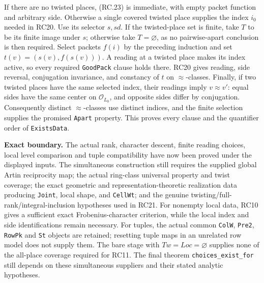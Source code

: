 If there are no twisted places, (RC.23) is immediate, with empty
packet function and arbitrary side. Otherwise a single covered
twisted place supplies the index $i_0$ needed in RC20.
Use its selector $s,sd$. If the twisted-place set is finite, take
$T$ to be its finite image under $s$; otherwise take $T=\varnothing$,
as no pairwise-apart conclusion is then required.
Select packets $f(i)$ by the preceding induction and set
$t(v)=(s(v),f(s(v)))$.
A reading at a twisted place makes its index active, so every
required \texttt{GoodPack} clause holds there.
RC20 gives reading, side reversal, conjugation invariance, and
constancy of $t$ on $\approx$-classes.
Finally, if two twisted places have the same selected index,
their readings imply $v\approx v'$: equal sides have the same
center on $\mathcal O_{L_0}$, and opposite sides differ by conjugation.
Consequently distinct $\approx$-classes use distinct indices, and
the finite selection supplies the promised \texttt{Apart} property.
This proves every clause and the quantifier order of
\texttt{ExistsData}.

\medskip
\noindent\textbf{Exact boundary.}
The actual rank, character descent, finite reading choices, local
level comparison and tuple compatibility have now been proved
under the displayed inputs. The simultaneous construction still
requires the supplied global Artin reciprocity map; the actual
ring-class universal property and twist coverage; the exact
geometric and representation-theoretic realization data producing
\texttt{Joint}, local shape, and \texttt{CellWt}; and the genuine
twisting/full-rank/integral-inclusion hypotheses used in RC21.
For nonempty local data, RC10 gives a sufficient exact
Frobenius-character criterion, while the local index and side
identifications remain necessary.
For tuples, the actual common \texttt{ColW}, \texttt{Pre2},
\texttt{RowPk} and \texttt{St} objects are retained; resetting tuple
maps in an unrelated row model does not supply them.
The bare stage with $Tw=Loc=\varnothing$ supplies none of the
all-place coverage required for RC11.
The final theorem \texttt{choices\_exist\_for} still depends on these
simultaneous suppliers and their stated analytic hypotheses.
